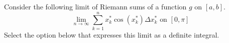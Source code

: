 \documentclass{ximera}
\author{Nela Lakos \and Kyle Parsons}
\begin{document}
\begin{exercise}

Consider the following limit of Riemann sums of a function $g$ on $[a,b]$.
\[
\lim_{n\to\infty}\sum_{k=1}^n x_k^*\cos(x_k^*)\Delta x_k^* \text{ on } [0,\pi]
\]
Select the option below that expresses this limit as a definite integral.

\begin{multipleChoice}
\end{multipleChoice}

\end{exercise}
\end{document}

